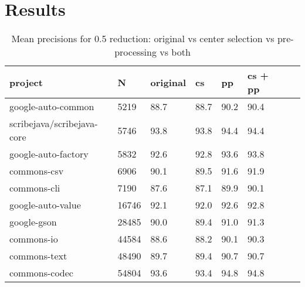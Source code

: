\documentclass[twoside]{uva-inf-bachelor-thesis}
\begin{document}
\section{Results}
\begin{table}[h]
    \centering
    \begin{tabular}{|l|l|l|l|l|l|l|l|}
    \hline
        project & N & original & cs & pp & cs + pp \\ \hline
        google-auto-common & 5219 & 88.7 & 88.7 & 90.2 & 90.4 \\ \hline
        scribejava/scribejava-core & 5746 & 93.8 & 93.8 & 94.4 & 94.4 \\ \hline
        google-auto-factory & 5832 & 92.6 & 92.8 & 93.6 &  93.8 \\ \hline
        commons-csv & 6906 & 90.1 & 89.5 & 91.6 & 91.9 \\ \hline
        commons-cli & 7190 & 87.6 & 87.1 & 89.9 & 90.1 \\ \hline
        google-auto-value & 16746 & 92.1 & 92.0 & 92.6 & 92.8 \\ \hline
        google-gson & 28485 & 90.0 & 89.4 & 91.0 & 91.3 \\ \hline
        commons-io & 44584 & 88.6 & 88.2 & 90.1 & 90.3 \\ \hline
        commons-text & 48490 & 89.7 & 89.4 & 90.7 & 90.7 \\ \hline
        commons-codec & 54804 & 93.6 & 93.4 & 94.8 & 94.8 \\ \hline
    \end{tabular}
    \label{tab:05CMT}
\caption{Mean precisions for 0.5 reduction: original vs center selection vs pre-processing vs both}
\end{table}
\end{document}
